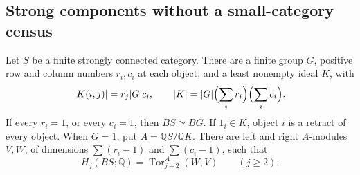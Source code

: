\subsection{Strong components without a small-category census}

\begin{lemma}
\label{CP2:A-high-Rees}
Let $S$ be a finite strongly connected category.  There are a
finite group $G$, positive row and column numbers $r_i,c_i$
at each object, and a least nonempty ideal $K$, with
\[
 |K(i,j)|=r_j|G|c_i,\qquad
 |K|=|G|\Bigl(\sum_i r_i\Bigr)\Bigl(\sum_i c_i\Bigr).
\]
If every $r_i=1$, or every $c_i=1$, then $BS\simeq BG$.
If $1_i\in K$, object $i$ is a retract of every object.
When $G=1$, put $A=\mathbb QS/\mathbb QK$.  There are
left and right $A$-modules $V,W$, of dimensions
$\sum(r_i-1)$ and $\sum(c_i-1)$, such that
\[
 H_j(BS;\mathbb Q)=\operatorname{Tor}_{j-2}^{A}(W,V)
 \qquad(j\geq2).
\]
\end{lemma}
